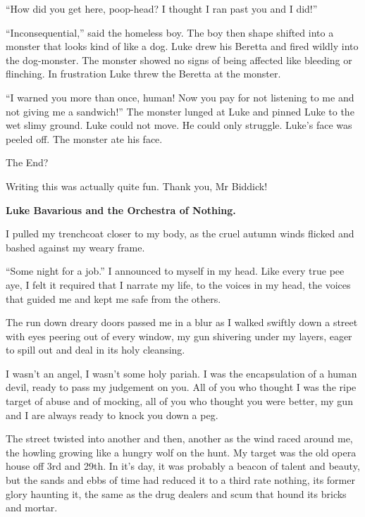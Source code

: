 ``How did you get here, poop-head? I thought I ran past you
and I did!''



``Inconsequential,'' said the homeless boy. The boy then
shape shifted into a monster that looks kind of like a dog. Luke
drew his Beretta and fired wildly into the dog-monster. The monster
showed no signs of being affected like bleeding or flinching. In
frustration Luke threw the Beretta at the monster.



``I warned you more than once, human! Now you pay for not
listening to me and not giving me a sandwich!'' The monster
lunged at Luke and pinned Luke to the wet slimy ground. Luke could
not move. He could only struggle. Luke's face was peeled off.
The monster ate his face.



The End?



Writing this was actually quite fun. Thank you, Mr Biddick! 

 





{\bf Luke Bavarious and the Orchestra of Nothing.}



I pulled my trenchcoat closer to my body, as the cruel autumn winds
flicked and bashed against my weary frame.

``Some night for a job.'' I announced to myself in my
head. Like every true pee aye, I felt it required that I narrate my
life, to the voices in my head, the voices that guided me and kept
me safe from the others.

The run down dreary doors passed me in a blur as I walked swiftly
down a street with eyes peering out of every window, my gun
shivering under my layers, eager to spill out and deal in its holy
cleansing.



I wasn't an angel, I wasn't some holy pariah. I was the
encapsulation of a human devil, ready to pass my judgement on you.
All of you who thought I was the ripe target of abuse and of
mocking, all of you who thought you were better, my gun and I are
always ready to knock you down a peg.



The street twisted into another and then, another as the wind raced
around me, the howling growing like a hungry wolf on the hunt. My
target was the old opera house off 3rd and 29th. In it's day,
it was probably a beacon of talent and beauty, but the sands and
ebbs of time had reduced it to a third rate nothing, its former
glory haunting it, the same as the drug dealers and scum that hound
its bricks and mortar.


